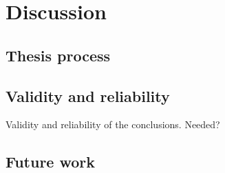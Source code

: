 \chapter{Discussion}

\section{Thesis process}

\section{Validity and reliability}
Validity and reliability of the conclusions. Needed?
\section{Future work}
